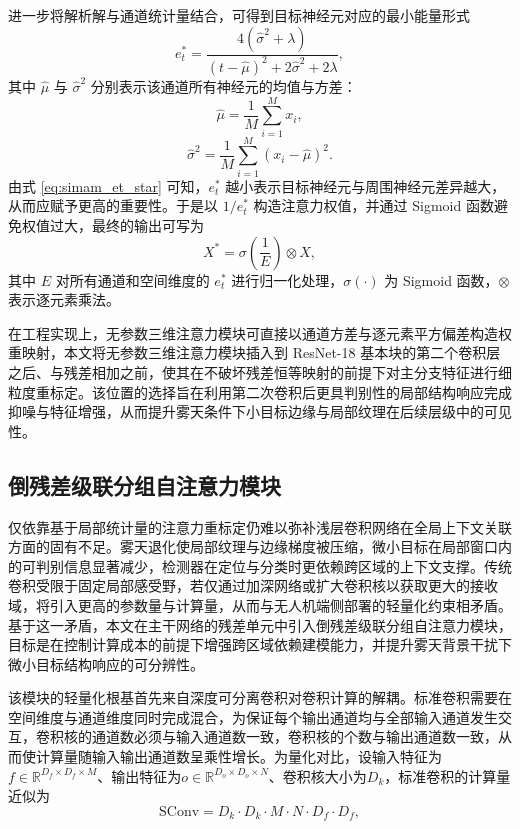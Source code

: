 进一步将解析解与通道统计量结合，可得到目标神经元对应的最小能量形式
\begin{equation}
e_t^\ast=\frac{4(\hat{\sigma}^2+\lambda)}{(t-\hat{\mu})^2+2\hat{\sigma}^2+2\lambda},
\label{eq:simam_et_star}
\end{equation}
其中 $\hat{\mu}$ 与 $\hat{\sigma}^2$ 分别表示该通道所有神经元的均值与方差：
\begin{equation}
\hat{\mu}=\frac{1}{M}\sum_{i=1}^{M}x_i ,
\label{eq:simam_mu_hat}
\end{equation}
\begin{equation}
\hat{\sigma}^2=\frac{1}{M}\sum_{i=1}^{M}(x_i-\hat{\mu})^2 .
\label{eq:simam_sigma_hat}
\end{equation}
由式 \eqref{eq:simam_et_star} 可知，$e_t^\ast$ 越小表示目标神经元与周围神经元差异越大，从而应赋予更高的重要性。于是以 $1/e_t^\ast$ 构造注意力权值，并通过 Sigmoid 函数避免权值过大，最终的输出可写为
\begin{equation}
X^\ast=\sigma\!\left(\frac{1}{E}\right)\otimes X ,
\label{eq:simam_output}
\end{equation}
其中 $E$ 对所有通道和空间维度的 $e_t^\ast$ 进行归一化处理，$\sigma(\cdot)$ 为 Sigmoid 函数，$\otimes$ 表示逐元素乘法。

在工程实现上，无参数三维注意力模块可直接以通道方差与逐元素平方偏差构造权重映射，本文将无参数三维注意力模块插入到 ResNet-18 基本块的第二个卷积层之后、与残差相加之前，使其在不破坏残差恒等映射的前提下对主分支特征进行细粒度重标定。该位置的选择旨在利用第二次卷积后更具判别性的局部结构响应完成抑噪与特征增强，从而提升雾天条件下小目标边缘与局部纹理在后续层级中的可见性。


\subsection{倒残差级联分组自注意力模块}
\label{subsec:irmb_cga}

仅依靠基于局部统计量的注意力重标定仍难以弥补浅层卷积网络在全局上下文关联方面的固有不足。雾天退化使局部纹理与边缘梯度被压缩，微小目标在局部窗口内的可判别信息显著减少，检测器在定位与分类时更依赖跨区域的上下文支撑。传统卷积受限于固定局部感受野，若仅通过加深网络或扩大卷积核以获取更大的接收域，将引入更高的参数量与计算量，从而与无人机端侧部署的轻量化约束相矛盾。基于这一矛盾，本文在主干网络的残差单元中引入倒残差级联分组自注意力模块，目标是在控制计算成本的前提下增强跨区域依赖建模能力，并提升雾天背景干扰下微小目标结构响应的可分辨性。

该模块的轻量化根基首先来自深度可分离卷积对卷积计算的解耦。标准卷积需要在空间维度与通道维度同时完成混合，为保证每个输出通道均与全部输入通道发生交互，卷积核的通道数必须与输入通道数一致，卷积核的个数与输出通道数一致，从而使计算量随输入输出通道数呈乘性增长。为量化对比，设输入特征为$f \in \mathbb{R}^{D_f \times D_f \times M}$、输出特征为$o \in \mathbb{R}^{D_o \times D_o \times N}$、卷积核大小为$D_k$，标准卷积的计算量近似为
\begin{equation}
\text{SConv} = D_k \cdot D_k \cdot M \cdot N \cdot D_f \cdot D_f,
\label{eq:sconv_flops_new}
\end{equation}

